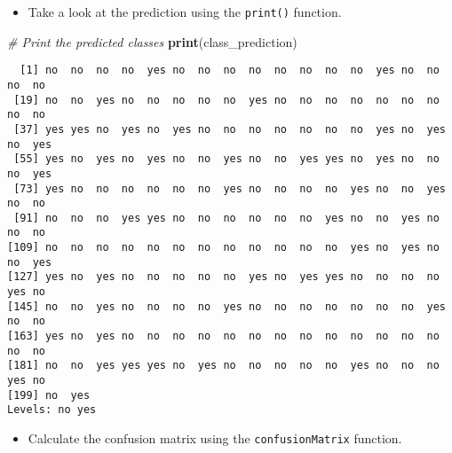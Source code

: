\documentclass[
]{book}
\newenvironment{Shaded}{\begin{snugshade}}{\end{snugshade}}
\newcommand{\CommentTok}[1]{\textcolor[rgb]{0.56,0.35,0.01}{\textit{#1}}}
\newcommand{\DataTypeTok}[1]{\textcolor[rgb]{0.13,0.29,0.53}{#1}}
\newcommand{\KeywordTok}[1]{\textcolor[rgb]{0.13,0.29,0.53}{\textbf{#1}}}
\newcommand{\NormalTok}[1]{#1}
\newcommand{\OperatorTok}[1]{\textcolor[rgb]{0.81,0.36,0.00}{\textbf{#1}}}
\providecommand{\tightlist}{%
  \setlength{\itemsep}{0pt}\setlength{\parskip}{0pt}}
\begin{document}
\begin{itemize}
\tightlist
\item
  Take a look at the prediction using the \texttt{print()} function.
\end{itemize}

\begin{Shaded}
\begin{Highlighting}[]
\CommentTok{# Print the predicted classes}
\KeywordTok{print}\NormalTok{(class_prediction)}
\end{Highlighting}
\end{Shaded}

\begin{verbatim}
  [1] no  no  no  no  yes no  no  no  no  no  no  no  no  yes no  no  no  no 
 [19] no  no  yes no  no  no  no  no  yes no  no  no  no  no  no  no  no  no 
 [37] yes yes no  yes no  yes no  no  no  no  no  no  no  yes no  yes no  yes
 [55] yes no  yes no  yes no  no  yes no  no  yes yes no  yes no  no  no  yes
 [73] yes no  no  no  no  no  no  yes no  no  no  no  yes no  no  yes no  no 
 [91] no  no  no  yes yes no  no  no  no  no  no  yes no  no  yes no  no  no 
[109] no  no  no  no  no  no  no  no  no  no  no  no  yes no  yes no  no  yes
[127] yes no  yes no  no  no  no  no  yes no  yes yes no  no  no  no  yes no 
[145] no  no  yes no  no  no  no  yes no  no  no  no  no  no  no  yes no  no 
[163] yes no  yes no  no  no  no  no  no  no  no  no  no  no  no  no  no  no 
[181] no  no  yes yes yes no  yes no  no  no  no  no  yes no  no  no  yes no 
[199] no  yes
Levels: no yes
\end{verbatim}

\begin{itemize}
\tightlist
\item
  Calculate the confusion matrix using the \texttt{confusionMatrix} function.
\end{itemize}

\begin{Shaded}
\end{Shaded}
\end{document}
